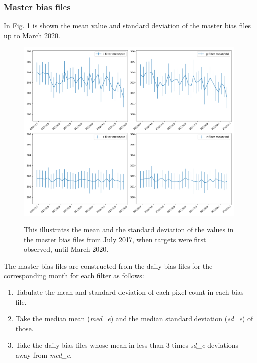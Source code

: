 \subsubsection{Master bias files}
\protect\label{section:masterbiasfiles}

In Fig. \ref{fig:mastmeanbias} is shown the mean value and standard deviation of
the master bias files up to March 2020.

\begin{figure}[!htbp]
\begin{center}
\includegraphics[scale=0.4]{images/mastmeanbias.png}
\end{center}   
\caption{This illustrates the mean and the standard deviation of the values in
the master bias files from July 2017, when {\rdwarf} targets were first
observed, until March 2020.}
\protect\label{fig:mastmeanbias}
\end{figure}
\clearpage

The master bias files are constructed from the daily bias files for the
corresponding month for each filter as follows:

\begin{enumerate}
  \item Tabulate the mean and standard deviation of each pixel count in each
  bias file.
  \item Take the median mean (\textit{med\_e}) and the median standard deviation
  (\textit{sd\_e}) of those.
  \item Take the daily bias files whose mean in less than 3 times \textit{sd\_e}
  deviations away from \textit{med\_e}.
\end{enumerate}

